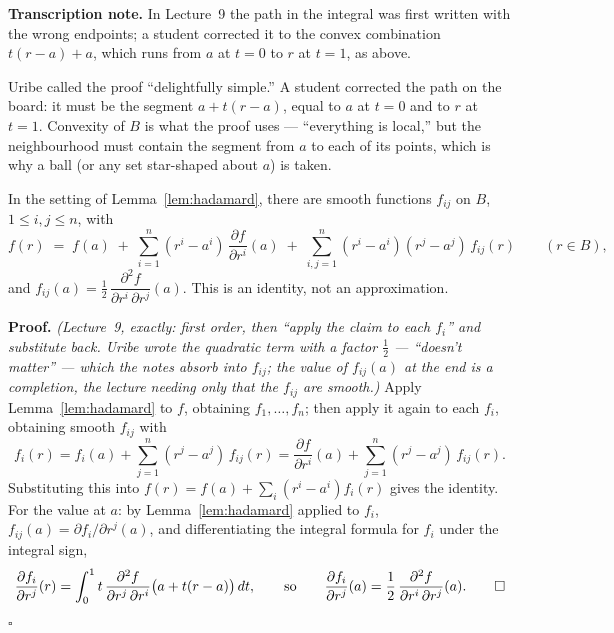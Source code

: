 \documentclass[11pt]{report}
\makeatletter
\newcounter{thmcounter}[section]
\renewenvironment{proof}[1][Proof]{\noindent\textbf{#1.} }{\hfill$\square$\par\vspace{5pt}}
\newcommand{\thmlabel}[1]{\edef\@currentlabel{\arabic{section}.\arabic{thmcounter}}\label{#1}}
\newcommand{\leeref}[1]{\par\smallskip{\raggedleft\footnotesize\textsc{Lee}:\ #1\par}}
\makeatother
\begin{document}
\textbf{Transcription note.} In Lecture~9 the path in the integral was first written with the wrong endpoints; a student corrected it to the convex combination $t(r - a) + a$, which runs from $a$ at $t = 0$ to $r$ at $t = 1$, as above.

Uribe called the proof ``delightfully simple.'' A student corrected the path on the board: it must be the segment $a + t(r - a)$, equal to $a$ at $t = 0$ and to $r$ at $t = 1$. Convexity of $B$ is what the proof uses --- ``everything is local,'' but the neighbourhood must contain the segment from $a$ to each of its points, which is why a ball (or any set star-shaped about $a$) is taken.

\begin{lembox}\thmlabel{lem:taylor-hadamard}
In the setting of Lemma~\ref{lem:hadamard}, there are smooth functions $f_{ij}$ on $B$, $1 \le i, j \le n$, with
\[
f(r) \;=\; f(a) \;+\; \sum_{i=1}^n (r^i - a^i)\, \frac{\partial f}{\partial r^i}(a) \;+\; \sum_{i,j=1}^n (r^i - a^i)(r^j - a^j)\, f_{ij}(r) \qquad (r \in B),
\]
and $f_{ij}(a) = \tfrac12\, \dfrac{\partial^2 f}{\partial r^i\,\partial r^j}(a)$. This is an identity, not an approximation.
\leeref{cf.\ Theorem C.15}
\end{lembox}

\begin{proof}
\textit{(Lecture~9, exactly: first order, then ``apply the claim to each $f_i$'' and substitute back. Uribe wrote the quadratic term with a factor $\tfrac12$ --- ``doesn't matter'' --- which the notes absorb into $f_{ij}$; the value of $f_{ij}(a)$ at the end is a completion, the lecture needing only that the $f_{ij}$ are smooth.)} Apply Lemma~\ref{lem:hadamard} to $f$, obtaining $f_1, \ldots, f_n$; then apply it again to each $f_i$, obtaining smooth $f_{ij}$ with
\[
f_i(r) = f_i(a) + \sum_{j=1}^n (r^j - a^j)\, f_{ij}(r) = \frac{\partial f}{\partial r^i}(a) + \sum_{j=1}^n (r^j - a^j)\, f_{ij}(r).
\]
Substituting this into $f(r) = f(a) + \sum_i (r^i - a^i) f_i(r)$ gives the identity. For the value at $a$: by Lemma~\ref{lem:hadamard} applied to $f_i$, $f_{ij}(a) = \partial f_i/\partial r^j(a)$, and differentiating the integral formula for $f_i$ under the integral sign,
\[
\frac{\partial f_i}{\partial r^j}(r) = \int_0^1 t\, \frac{\partial^2 f}{\partial r^j\,\partial r^i}\big(a + t(r-a)\big)\, dt, \qquad\text{so}\qquad \frac{\partial f_i}{\partial r^j}(a) = \frac12\, \frac{\partial^2 f}{\partial r^i\,\partial r^j}(a). \qedhere
\]
\end{proof}
\end{document}
